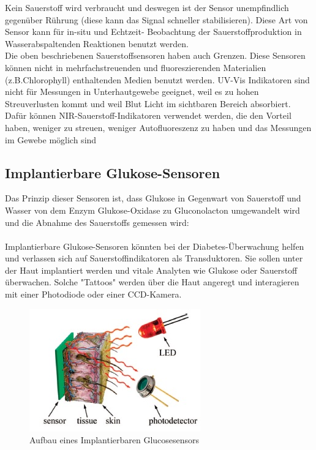  Kein Sauerstoff wird verbraucht und deswegen ist der Sensor unempfindlich gegenüber Rührung (diese kann das Signal schneller stabilisieren). Diese Art von Sensor kann für in-situ und Echtzeit- Beobachtung der Sauerstoffproduktion in Wasserabspaltenden Reaktionen benutzt werden. \cite{[7]}
\\Die oben beschriebenen Sauerstoffsensoren haben auch Grenzen. Diese Sensoren können nicht in mehrfachstreuenden und fluoreszierenden Materialien (z.B.Chlorophyll) enthaltenden Medien benutzt werden. UV-Vis Indikatoren sind nicht für Messungen in Unterhautgewebe geeignet, weil es zu hohen Streuverlusten kommt und weil Blut Licht im sichtbaren Bereich absorbiert.
\\Dafür können NIR-Sauerstoff-Indikatoren verwendet werden, die den Vorteil haben, weniger zu streuen, weniger Autofluoreszenz zu haben und das Messungen im Gewebe möglich sind \cite{[6]} %
\subsection{Implantierbare Glukose-Sensoren}
Das Prinzip dieser Sensoren ist, dass Glukose in Gegenwart von Sauerstoff und Wasser  von dem Enzym Glukose-Oxidase zu Gluconolacton umgewandelt wird und die Abnahme des Sauerstoffs gemessen wird:
\\
\\Implantierbare Glukose-Sensoren könnten bei der Diabetes-Überwachung helfen und verlassen sich auf Sauerstoffindikatoren als Transduktoren. Sie sollen unter der Haut implantiert werden und vitale Analyten wie Glukose oder Sauerstoff überwachen. Solche "Tattoos" werden über die Haut angeregt und interagieren mit einer Photodiode oder einer CCD-Kamera.  \cite{[6]}
\begin{figure}[htpb]
\centering
\includegraphics[scale=1]{graphics/Glucose-Sensor}
\caption{Aufbau eines Implantierbaren Glucosesensors}
\end{figure}
